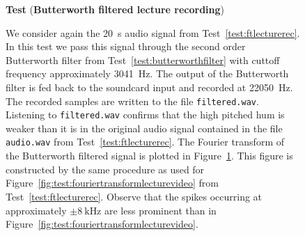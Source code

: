 \documentclass[11pt,a4paper]{book}
\theoremstyle{plain}
\numberwithin{equation}{section}
\newcommand{\abs}[1]{\left\vert #1 \right\vert}
\newcounter{test}
\newenvironment{test}{
\begin{shaded}\refstepcounter{test}\par\noindent%
\textbf{Test \thetest}
}{
\end{shaded}
}
\newenvironment{randomfloat}{
\begin{figure}
}{
\end{figure}
\addtocounter{figure}{-1}
}
\begin{document}
\begin{randomfloat}[p]
\begin{test}\label{test:butterworthfilteredlecturerec}
(\textbf{Butterworth filtered lecture recording})

We consider again the \SI{20}{\second} audio signal from Test~\ref{test:ftlecturerec}.  In this test we pass this signal through the second order Butterworth filter from Test~\ref{test:butterworthfilter} with cuttoff frequency approximately \SI{3041}{\hertz}.  The output of the Butterworth filter is fed back to the soundcard input and recorded at \SI{22050}{\hertz}.  The recorded samples are written to the file \texttt{filtered.wav}.  Listening to \texttt{filtered.wav} confirms that the high pitched hum is weaker than it is in the original audio signal contained in the file \texttt{audio.wav} from Test~\ref{test:ftlecturerec}.  The Fourier transform of the Butterworth filtered signal is plotted in Figure~\ref{fig:test:butterworthedfouriertransformlecturevideo}.  This figure is constructed by the same procedure as used for Figure~\ref{fig:test:fouriertransformlecturevideo} from Test~\ref{test:ftlecturerec}.  Observe that the spikes occurring at approximately $\pm\SI{8}{\kilo\hertz}$ are less prominent than in Figure~\ref{fig:test:fouriertransformlecturevideo}.

\begin{center}
\label{fig:test:butterworthedfouriertransformlecturevideo}
\end{center}

\end{test}
\end{randomfloat}
\end{document}
